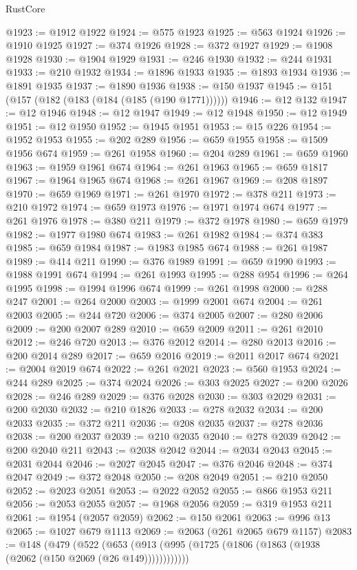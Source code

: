 \begin{lexlean}{RustCore}
\begin{coremodule}
@1923 := @1912 @1922
@1924 := @575 @1923
@1925 := @563 @1924
@1926 := @1910 @1925
@1927 := @374 @1926
@1928 := @372 @1927
@1929 := @1908 @1928
@1930 := @1904 @1929
@1931 := @246 @1930
@1932 := @244 @1931
@1933 := @210 @1932
@1934 := @1896 @1933
@1935 := @1893 @1934
@1936 := @1891 @1935
@1937 := @1890 @1936
@1938 := @150 @1937
@1945 := @151 (@157 (@182 (@183 (@184 (@185 (@190 @1771))))))
@1946 := @12 @132
@1947 := @12 @1946
@1948 := @12 @1947
@1949 := @12 @1948
@1950 := @12 @1949
@1951 := @12 @1950
@1952 := @1945 @1951
@1953 := @15 @226
@1954 := @1952 @1953
@1955 := @202 @289
@1956 := @659 @1955
@1958 := @1509 @1956 @674
@1959 := @261 @1958
@1960 := @204 @289
@1961 := @659 @1960
@1963 := @1959 @1961 @674
@1964 := @261 @1963
@1965 := @659 @1817
@1967 := @1964 @1965 @674
@1968 := @261 @1967
@1969 := @208 @1897
@1970 := @659 @1969
@1971 := @261 @1970
@1972 := @378 @211
@1973 := @210 @1972
@1974 := @659 @1973
@1976 := @1971 @1974 @674
@1977 := @261 @1976
@1978 := @380 @211
@1979 := @372 @1978
@1980 := @659 @1979
@1982 := @1977 @1980 @674
@1983 := @261 @1982
@1984 := @374 @383
@1985 := @659 @1984
@1987 := @1983 @1985 @674
@1988 := @261 @1987
@1989 := @414 @211
@1990 := @376 @1989
@1991 := @659 @1990
@1993 := @1988 @1991 @674
@1994 := @261 @1993
@1995 := @288 @954
@1996 := @264 @1995
@1998 := @1994 @1996 @674
@1999 := @261 @1998
@2000 := @288 @247
@2001 := @264 @2000
@2003 := @1999 @2001 @674
@2004 := @261 @2003
@2005 := @244 @720
@2006 := @374 @2005
@2007 := @280 @2006
@2009 := @200 @2007 @289
@2010 := @659 @2009
@2011 := @261 @2010
@2012 := @246 @720
@2013 := @376 @2012
@2014 := @280 @2013
@2016 := @200 @2014 @289
@2017 := @659 @2016
@2019 := @2011 @2017 @674
@2021 := @2004 @2019 @674
@2022 := @261 @2021
@2023 := @560 @1953
@2024 := @244 @289
@2025 := @374 @2024
@2026 := @303 @2025
@2027 := @200 @2026
@2028 := @246 @289
@2029 := @376 @2028
@2030 := @303 @2029
@2031 := @200 @2030
@2032 := @210 @1826
@2033 := @278 @2032
@2034 := @200 @2033
@2035 := @372 @211
@2036 := @208 @2035
@2037 := @278 @2036
@2038 := @200 @2037
@2039 := @210 @2035
@2040 := @278 @2039
@2042 := @200 @2040 @211
@2043 := @2038 @2042
@2044 := @2034 @2043
@2045 := @2031 @2044
@2046 := @2027 @2045
@2047 := @376 @2046
@2048 := @374 @2047
@2049 := @372 @2048
@2050 := @208 @2049
@2051 := @210 @2050
@2052 := @2023 @2051
@2053 := @2022 @2052
@2055 := @866 @1953 @211
@2056 := @2053 @2055
@2057 := @1968 @2056
@2059 := @319 @1953 @211
@2061 := @1954 (@2057 @2059)
@2062 := @150 @2061
@2063 := @996 @13
@2065 := @1027 @679 @1113
@2069 := @2063 (@261 @2065 @679 @1157)
@2083 := @148
    (@479
      (@522 (@653 (@913 (@995 (@1725 (@1806 (@1863 (@1938 (@2062 (@150 @2069 (@26 @149))))))))))))

\end{coremodule}
\end{lexlean}
